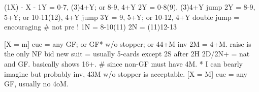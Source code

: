 (1X) - X -
1Y = 0-7, (3)4+Y; or 8-9, 4+Y
2Y = 0-8(9), (3)4+Y
jump 2Y = 8-9, 5+Y; or 10-11(12), 4+Y
jump 3Y = 9, 5+Y; or 10-12, 4+Y
double jump = encouraging  # not pre !
1N = 8-10(11)
2N = (11)12-13

[X = m] cue = any GF; or GF* w/o stopper; or 44+M inv 
    2M = 4+M. raise is the only NF bid 
        new suit = usually 5-cards except 2S after 2H
    2D/2N+ = nat and GF. basically shows 16+.  # since non-GF must have 4M.
    * I can bearly imagine but probably inv, 43M w/o stopper is acceptable.
[X = M] cue = any GF, usually no 4oM.